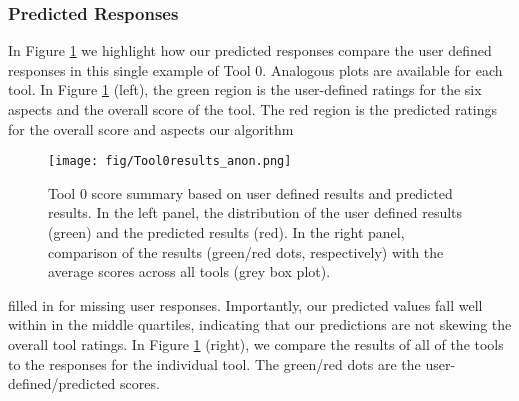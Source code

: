 \subsubsection{Predicted Responses}
 In Figure \ref{fig:toolEx} we highlight how our predicted responses compare the user defined responses in this single example of Tool 0. Analogous 
 plots are available for each tool. In Figure \ref{fig:toolEx} (left), the green region is the user-defined ratings for the six aspects and the overall score of the tool. The red region is the predicted ratings for the overall score and aspects our algorithm  
 \vspace{-10pt}
  \begin{figure}[H]
    \centering
    \texttt{[image: fig/Tool0results\_anon.png]}
    \captionsetup{font = scriptsize}
    \caption{Tool 0 score summary based on user defined results and predicted results. In the left panel, the distribution of the user defined results (green) and the predicted results (red). In the right panel, comparison of the results (green/red dots, respectively) with the average scores across all tools (grey box plot).}
    \label{fig:toolEx}
\end{figure}
\vspace{-8mm}
 \noindent filled in for missing user responses. Importantly, our predicted values fall well within in the middle quartiles, indicating that our predictions are not skewing the overall tool ratings.
 In Figure \ref{fig:toolEx} (right), we compare the results of all of the tools to the responses for the individual tool. The green/red dots are the user-defined/predicted scores.
 

